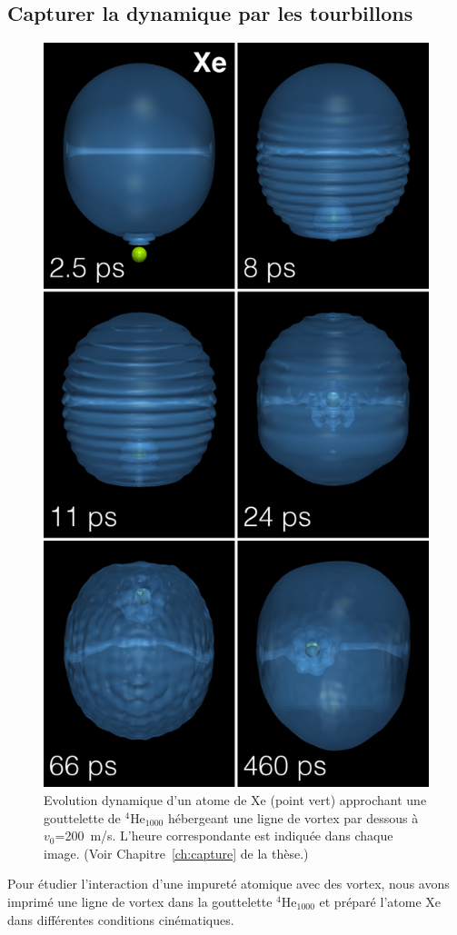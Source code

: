 	\subsection*{Capturer la dynamique par les tourbillons}
		\begin{figure}
			\centering
			\includegraphics[width=0.75\linewidth]{fig10}
			\caption{\label{fig10-capture}
			Evolution dynamique d'un atome de Xe (point vert) approchant une gouttelette de $^4$He$_{1000}$ hébergeant une ligne de vortex par dessous à $v_0$=200~m/s. L'heure correspondante est indiquée dans chaque image. (Voir Chapitre~\ref{ch:capture} de la thèse.)}
		\end{figure}	
		Pour étudier l'interaction d'une impureté atomique avec des vortex, nous avons imprimé une ligne de vortex dans la gouttelette $^4$He$_{1000}$ et préparé l'atome Xe dans différentes conditions cinématiques.

